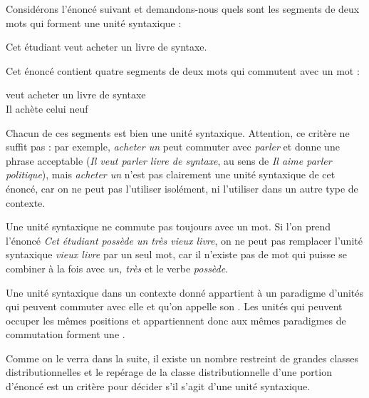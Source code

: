 Considérons l’énoncé suivant et demandons-nous quels sont les segments de deux mots qui forment une unité syntaxique :

\ea\label{ex:3:2:9}
    {Cet étudiant veut acheter un livre de syntaxe.}
\z

Cet énoncé contient quatre segments de deux mots qui commutent avec un mot :

\begin{exe}
  {veut acheter}  {un livre}  {de syntaxe}\\
     Il  achète  celui  neuf\\
\end{exe}

Chacun de ces segments est bien une unité syntaxique. Attention, ce critère ne suffit pas : par exemple, \textit{acheter un} peut commuter avec \textit{parler} et donne une phrase acceptable (\textit{Il veut parler livre de syntaxe}, au sens de \textit{Il aime parler politique}), mais \textit{acheter un} n’est pas clairement une unité syntaxique de cet énoncé, car on ne peut pas l’utiliser isolément, ni l’utiliser dans un autre type de contexte.

Une unité syntaxique ne commute pas toujours avec un mot. Si l’on prend l’énoncé \textit{Cet étudiant possède un très vieux livre}, on ne peut pas remplacer l’unité syntaxique \textit{vieux livre} par un seul mot, car il n’existe pas de mot qui puisse se combiner à la fois avec \textit{un, très} et le verbe \textit{possède}.

{Une unité syntaxique dans un contexte donné appartient à un paradigme d’unités qui peuvent commuter avec elle et qu’on appelle son . Les unités qui peuvent occuper les mêmes positions et appartiennent donc aux mêmes paradigmes de commutation forment une .}

Comme on le verra dans la suite, il existe un nombre restreint de grandes classes distributionnelles et le repérage de la classe distributionnelle d’une portion d’énoncé est un critère pour décider s’il s’agit d’une unité syntaxique.

